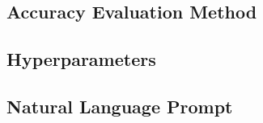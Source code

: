 

\subsection{Accuracy Evaluation Method}
\label{sec:acc_eval_method}


\subsection{Hyperparameters}
\label{sec:pcg_agent_parameters}


\small{
\newpage
\onecolumn
\subsection{Natural Language Prompt}
\label{sec:prompt_example}

}



